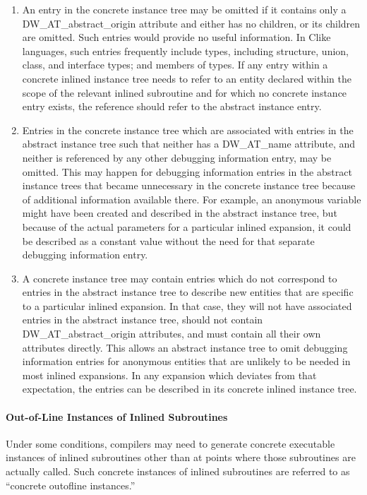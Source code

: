 \begin{enumerate}[1.]
\item An entry in the concrete instance tree may be omitted if
it contains only a DW\-\_AT\-\_abstract\-\_origin attribute and either
has no children, or its children are omitted. Such entries
would provide no useful information. In C\dash like languages,
such entries frequently include types, including structure,
union, class, and interface types; and members of types. If any
entry within a concrete inlined instance tree needs to refer
to an entity declared within the scope of the relevant inlined
subroutine and for which no concrete instance entry exists,
the reference should refer to the abstract instance entry.

\item Entries in the concrete instance tree which are associated
with entries in the abstract instance tree such that neither
has a DW\_AT\_name attribute, and neither is referenced by
any other debugging information entry, may be omitted. This
may happen for debugging information entries in the abstract
instance trees that became unnecessary in the concrete instance
tree because of additional information available there. For
example, an anonymous variable might have been created and
described in the abstract instance tree, but because of
the actual parameters for a particular inlined expansion,
it could be described as a constant value without the need
for that separate debugging information entry.

\item A concrete instance tree may contain entries which do
not correspond to entries in the abstract instance tree
to describe new entities that are specific to a particular
inlined expansion. In that case, they will not have associated
entries in the abstract instance tree, should not contain
DW\_AT\_abstract\_origin attributes, and must contain all their
own attributes directly. This allows an abstract instance tree
to omit debugging information entries for anonymous entities
that are unlikely to be needed in most inlined expansions. In
any expansion which deviates from that expectation, the
entries can be described in its concrete inlined instance tree.

\end{enumerate}

\paragraph{Out-of-Line Instances of Inlined Subroutines}
\label{chap:outoflineinstancesofinlinedsubroutines}
Under some conditions, compilers may need to generate concrete
executable instances of inlined subroutines other than at
points where those subroutines are actually called. Such
concrete instances of inlined subroutines are referred to as
``concrete out\dash of\dash line instances.''

